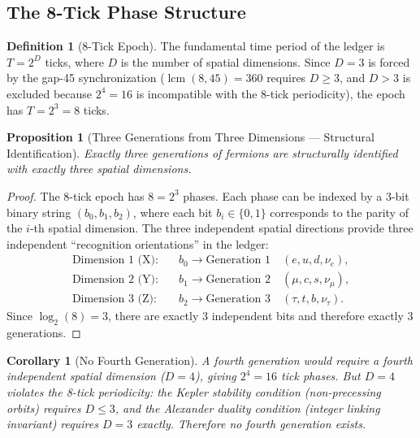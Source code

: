 \documentclass[12pt,a4paper]{article}
\newtheorem{corollary}[theorem]{Corollary}
\newtheorem{proposition}[theorem]{Proposition}
\theoremstyle{definition}
\newtheorem{definition}[theorem]{Definition}
\theoremstyle{remark}
\begin{document}
\subsection{The 8-Tick Phase Structure}

\begin{definition}[8-Tick Epoch]
\label{def:eight-tick}
The fundamental time period of the ledger is $T = 2^D$ ticks,
where $D$ is the number of spatial dimensions.  Since $D = 3$
is forced by the gap-45 synchronization
($\operatorname{lcm}(8, 45) = 360$ requires $D \geq 3$, and
$D > 3$ is excluded because $2^4 = 16$ is incompatible with
the 8-tick periodicity), the epoch has $T = 2^3 = 8$ ticks.
\end{definition}

\begin{proposition}[Three Generations from Three Dimensions --- Structural Identification]
\label{thm:three-gen}
Exactly three generations of fermions are structurally identified with
exactly three spatial dimensions.
\end{proposition}

\begin{proof}
The 8-tick epoch has $8 = 2^3$ phases.  Each phase can be
indexed by a 3-bit binary string $(b_0, b_1, b_2)$, where
each bit $b_i \in \{0, 1\}$ corresponds to the parity of the
$i$-th spatial dimension.  The three independent spatial
directions provide three independent ``recognition
orientations'' in the ledger:
\begin{align}
  \text{Dimension 1 (X):} & \quad b_0 \to \text{Generation 1}
  \quad (e, u, d, \nu_e), \\
  \text{Dimension 2 (Y):} & \quad b_1 \to \text{Generation 2}
  \quad (\mu, c, s, \nu_\mu), \\
  \text{Dimension 3 (Z):} & \quad b_2 \to \text{Generation 3}
  \quad (\tau, t, b, \nu_\tau).
\end{align}
Since $\log_2(8) = 3$, there are exactly 3 independent bits
and therefore exactly 3 generations.
\end{proof}

\begin{corollary}[No Fourth Generation]
\label{cor:no-fourth}
A fourth generation would require a fourth independent spatial
dimension ($D = 4$), giving $2^4 = 16$ tick phases.  But
$D = 4$ violates the 8-tick periodicity: the Kepler stability
condition (non-precessing orbits) requires $D \leq 3$, and the
Alexander duality condition (integer linking invariant) requires
$D = 3$ exactly.  Therefore no fourth generation exists.
\end{corollary}
\end{document}
